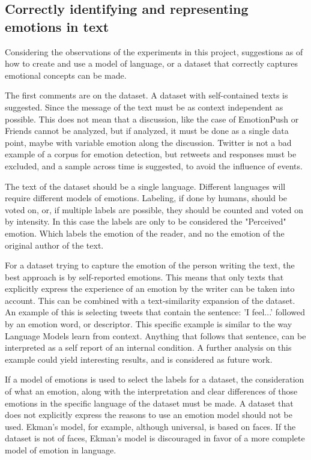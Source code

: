 \subsection{Correctly identifying and representing emotions in text}
Considering the observations of the experiments in this project, suggestions as of how to create and use a model of language, or a dataset that correctly captures emotional concepts can be made.

The first comments are on the dataset. A dataset with self-contained texts is suggested. Since the message of the text must be as context independent as possible. This does not mean that a discussion, like the case of EmotionPush or Friends cannot be analyzed, but if analyzed, it must be done as a single data point, maybe with variable emotion along the discussion.
Twitter is not a bad example of a corpus for emotion detection, but retweets and responses must be excluded, and a sample across time is suggested, to avoid the influence of events.

The text of the dataset should be a single language. Different languages will require different models of emotions. Labeling, if done by humans, should be voted on, or, if multiple labels are possible, they should be counted and voted on by intensity. In this case the labels are only to be considered the "Perceived" emotion. Which labels the emotion of the reader, and no the emotion of the original author of the text.

For a dataset trying to capture the emotion of the person writing the text, the best approach is by self-reported emotions. This means that only texts that explicitly express the experience of an emotion by the writer can be taken into account. This can be combined with a text-similarity expansion of the dataset. An example of this is selecting tweets that contain the sentence: 'I feel...' followed by an emotion word, or descriptor. This specific example is similar to the way Language Models learn from context. Anything that follows that sentence, can be interpreted as a self report of an internal condition. A further analysis on this example could yield interesting results, and is considered as future work.

If a model of emotions is used to select the labels for a dataset, the consideration of what an emotion, along with the interpretation and clear differences of those emotions in the specific language of the dataset must be made. A dataset that does not explicitly express the reasons to use an emotion model should not be used. Ekman's model, for example, although universal, is based on faces. If the dataset is not of faces, Ekman's model is discouraged in favor of a more complete model of emotion in language.

